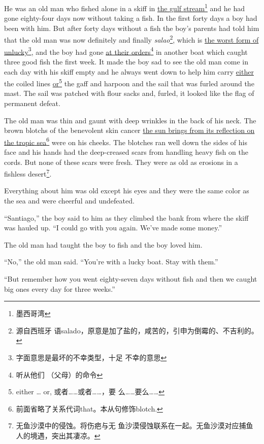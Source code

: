 \documentclass[fontset=ubuntu]{ctexrep}
\begin{document}
He was an old man who fished alone in a \gls{skiff} in \uline{the \Gls{gulf}
  \Gls{stream}}\footnote{墨西哥湾} and he had gone eighty-four days now without
taking a fish. In the first forty days a boy had been with him. But after
forty days without a fish the boy's parents had told him that the old man
was now \gls{definitely} and finally \emph{salao}\footnote{源自西班牙
  语salado，原意是加了盐的，咸苦的，引申为倒霉的、不吉利的。}, which is
\uline{the worst \gls{form} of unlucky}\footnote{字面意思是最坏的不幸类型，十足
  不幸的意思}, and the boy had gone \uline{at their orders}\footnote{听从他们
  （父母）的命令} in another boat which caught three good fish the first
week. It made the boy sad to see the old man come in each day with his
skiff empty and he always went down to help him carry \uline{either} the
\gls{coiled} lines \uline{or}\footnote{either \ldots{} or, 或者……或者……，要
  么……要么……} the \gls{gaff} and \gls{harpoon} and the \gls{sail} that was
\gls{furled} around the \gls{mast}. The sail was patched with \gls{flour}
\glspl{sack} and, \gls{furled}, it looked like the flag of \gls{permanent} \gls{defeat}.

The old man was thin and \gls{gaunt} with deep \glspl{wrinkle} in the back
of his neck. The brown \glspl{blotch} of the \gls{benevolent} \gls{skin}
cancer \uline{the sun \glspl{bring} from its \gls{reflection} on the
  \gls{tropic} sea}\footnote{前面省略了关系代词that。本从句修饰blotch.} were
on his \glspl{cheek}. The blotches ran well down the sides of his face and his
hands had the \gls{deep-creased} \glspl{scar} from handling heavy fish on
the \glspl{cord}. But none of these scars were fresh. They were \gls{as} old
as \glspl{erosion} in a fishless desert\footnote{无鱼沙漠中的侵蚀。将伤疤与无
  鱼沙漠侵蚀联系在一起。无鱼沙漠对应捕鱼人的境遇，突出其凄凉。}.

Everything about him was old \gls{except} his eyes and they were the same
color as the sea and were \gls{cheerful} and \gls{undefeated}.

``Santiago,'' the boy said to him as they climbed the \gls{bank} from where the
skiff was \gls{hauled} up. ``I could go with you again. We've made some money.''

The old man had taught the boy to fish and the boy loved him.

``No,'' the old man said. ``You're with a lucky boat. Stay with them.''

``But remember how you went eighty-seven days without fish and then we caught big ones every day for three weeks.''
\end{document}
